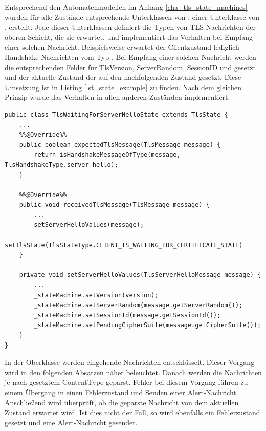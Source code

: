 Entsprechend den Automatenmodellen im Anhang \ref{cha_tls_state_machines} wurden für alle Zustände entsprechende Unterklassen von , einer Unterklasse von , erstellt. Jede dieser Unterklassen definiert die Typen von TLS-Nachrichten der oberen Schicht, die sie erwartet, und implementiert das Verhalten bei Empfang einer solchen Nachricht. Beispielsweise erwartet der Clientzustand  lediglich Handshake-Nachrichten vom Typ \serverhello{}. Bei Empfang einer solchen Nachricht werden die entsprechenden Felder für TlsVersion, ServerRandom, SessionID und \ciphersuite{} gesetzt und der aktuelle Zustand der  auf den nachfolgenden Zustand gesetzt. Diese Umsetzung ist in Listing \ref{lst_state_example} zu finden. Nach dem gleichen Prinzip wurde das Verhalten in allen anderen Zuständen implementiert. 

\begin{lstlisting}
public class TlsWaitingForServerHelloState extends TlsState {
	...
	%%@Override%%
	public boolean expectedTlsMessage(TlsMessage message) {
		return isHandshakeMessageOfType(message, TlsHandshakeType.server_hello);
	}

	%%@Override%%
	public void receivedTlsMessage(TlsMessage message) {
		...
		setServerHelloValues(message);
		setTlsState(TlsStateType.CLIENT_IS_WAITING_FOR_CERTIFICATE_STATE)
	}

	private void setServerHelloValues(TlsServerHelloMessage message) {
		...
		_stateMachine.setVersion(version);
		_stateMachine.setServerRandom(message.getServerRandom());
		_stateMachine.setSessionId(message.getSessionId());
		_stateMachine.setPendingCipherSuite(message.getCipherSuite());
	}
}
\end{lstlisting}

In der Oberklasse  werden eingehende Nachrichten entschlüsselt. Dieser Vorgang wird in den folgenden Absätzen näher beleuchtet. Danach werden die Nachrichten je nach gesetztem ContentType geparst. Fehler bei diesem Vorgang führen zu einem Übergang in einen Fehlerzustand und Senden einer Alert-Nachricht. Anschließend wird überprüft, ob die geparste Nachricht von dem aktuellen Zustand erwartet wird. Ist dies nicht der Fall, so wird ebenfalls ein Fehlerzustand gesetzt und eine Alert-Nachricht gesendet.

